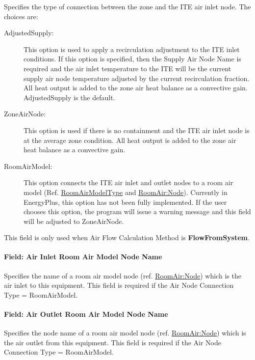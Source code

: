 Specifies the type of connection between the zone and the ITE air inlet node. The choices are:

\begin{description}
	\item[AdjustedSupply:] This option is used to apply a recirculation adjustment to the ITE inlet conditions. If this option is specified, then the Supply Air Node Name is required and the air inlet temperature to the ITE will be the current supply air node temperature adjusted by the current recirculation fraction. All heat output is added to the zone air heat balance as a convective gain. AdjustedSupply is the default.

	\item[ZoneAirNode:] This option is used if there is no containment and the ITE air inlet node is at the average zone condition. All heat output is added to the zone air heat balance as a convective gain.

	\item[RoomAirModel:] This option connects the ITE air inlet and outlet nodes to a room air model (Ref. \hyperref[roomairmodeltype]{RoomAirModelType} and \hyperref[roomairnode]{RoomAir:Node}).  Currently in EnergyPlus, this option has not been fully implemented.  If the user chooses this option, the program will issue a warning message and this field will be adjusted to ZoneAirNode.
\end{description}

This field is only used when Air Flow Calculation Method is \textbf{FlowFromSystem}.

\paragraph{Field: Air Inlet Room Air Model Node Name}\label{field-air-inlet-room-air-model-node-name}

Specifies the name of a room air model node (ref. \hyperref[roomairnode]{RoomAir:Node}) which is the air inlet to this equipment. This field is required if the Air Node Connection Type = RoomAirModel.

\paragraph{Field: Air Outlet Room Air Model Node Name}\label{field-air-outlet-room-air-model-node-name}

Specifies the node name of a room air model node (ref. \hyperref[roomairnode]{RoomAir:Node}) which is the air outlet from this equipment. This field is required if the Air Node Connection Type = RoomAirModel.

